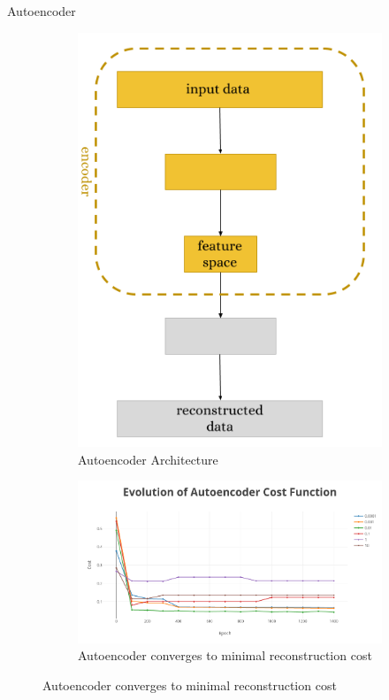 \documentclass[final]{beamer}
\newlength{\onecolwid}
\begin{document}
\begin{frame}[t]
\begin{columns}[t]
\begin{column}{\onecolwid}
\begin{block}{Autoencoder}
\begin{figure}[!ht]
\begin{subfigure}{.5\textwidth}
    \centering
    \includegraphics[width=.8\linewidth]{images/encoder-decoder.png}
    \caption{Autoencoder Architecture}
\end{subfigure}%
\begin{subfigure}{.5\textwidth}
    \centering
    \includegraphics[width=.9\linewidth]{images/ae_cost.png}
    \caption{Autoencoder converges to minimal reconstruction cost}
\end{subfigure}
\end{figure}
   

\end{block}
\end{column}
\end{columns}
\end{frame}
\end{document}
